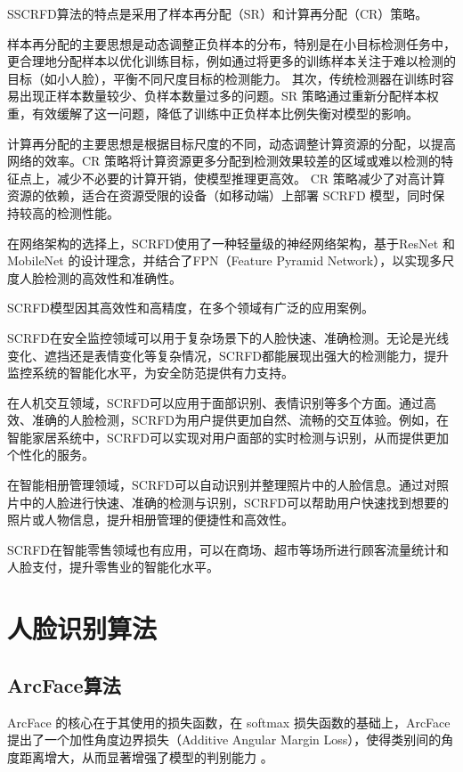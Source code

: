\documentclass[a4paper]{article}
\begin{document}
SSCRFD算法的特点是采用了样本再分配（SR）和计算再分配（CR）策略。

样本再分配的主要思想是动态调整正负样本的分布，特别是在小目标检测任务中，更合理地分配样本以优化训练目标，例如通过将更多的训练样本关注于难以检测的目标（如小人脸），平衡不同尺度目标的检测能力。
其次，传统检测器在训练时容易出现正样本数量较少、负样本数量过多的问题。SR 策略通过重新分配样本权重，有效缓解了这一问题，降低了训练中正负样本比例失衡对模型的影响。

计算再分配的主要思想是根据目标尺度的不同，动态调整计算资源的分配，以提高网络的效率。CR 策略将计算资源更多分配到检测效果较差的区域或难以检测的特征点上，减少不必要的计算开销，使模型推理更高效。
CR 策略减少了对高计算资源的依赖，适合在资源受限的设备（如移动端）上部署 SCRFD 模型，同时保持较高的检测性能。

在网络架构的选择上，SCRFD使用了一种轻量级的神经网络架构，基于ResNet 和 MobileNet 的设计理念，并结合了FPN（Feature Pyramid Network），以实现多尺度人脸检测的高效性和准确性。

SCRFD模型因其高效性和高精度，在多个领域有广泛的应用案例。

SCRFD在安全监控领域可以用于复杂场景下的人脸快速、准确检测。无论是光线变化、遮挡还是表情变化等复杂情况，SCRFD都能展现出强大的检测能力，提升监控系统的智能化水平，为安全防范提供有力支持。

在人机交互领域，SCRFD可以应用于面部识别、表情识别等多个方面。通过高效、准确的人脸检测，SCRFD为用户提供更加自然、流畅的交互体验。例如，在智能家居系统中，SCRFD可以实现对用户面部的实时检测与识别，从而提供更加个性化的服务。

在智能相册管理领域，SCRFD可以自动识别并整理照片中的人脸信息。通过对照片中的人脸进行快速、准确的检测与识别，SCRFD可以帮助用户快速找到想要的照片或人物信息，提升相册管理的便捷性和高效性。

SCRFD在智能零售领域也有应用，可以在商场、超市等场所进行顾客流量统计和人脸支付，提升零售业的智能化水平。

\section{人脸识别算法}

\subsection{ArcFace算法}

ArcFace 的核心在于其使用的损失函数，在 softmax 损失函数的基础上，ArcFace提出了一个加性角度边界损失（Additive Angular Margin Loss），使得类别间的角度距离增大，从而显著增强了模型的判别能力\cite{deng2019arcface} \cite{deng2020sub} \cite{deng2019arcfacedisguised}。
\end{document}
